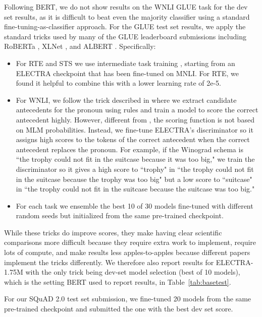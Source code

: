 \documentclass{article}
\begin{document}
Following BERT, we do not show results on the WNLI GLUE task for the dev set results, as it is difficult to beat even the majority classifier using a standard fine-tuning-as-classifier approach.
For the GLUE test set results, we apply the standard tricks used by many of the GLUE leaderboard submissions including RoBERTa \citep{liu2019roberta}, XLNet \citep{yang2019xlnet}, and ALBERT \citep{lan2019albert}. Specifically:
\begin{itemize}
    \item For RTE and STS we use intermediate task training \citep{phang2018sentence}, starting from an ELECTRA checkpoint that has been fine-tuned on MNLI\@. For RTE, we found it helpful to combine this with a lower learning rate of 2e-5. 
    \item For WNLI, we follow the trick described in \citet{liu2019roberta} where we extract candidate antecedents for the pronoun using rules and train a model to score the correct antecedent highly. However, different from \citet{liu2019roberta}, the scoring function is not based on MLM probabilities. Instead, we fine-tune ELECTRA's discriminator so it assigns high scores to the tokens of the correct antecedent when the correct antecedent replaces the pronoun. For example, if the Winograd schema is ``the trophy could not fit in the suitcase because it was too big," we train the discriminator so it gives a high score to ``trophy" in ``the trophy could not fit in the suitcase because the trophy was too big" but a low score to ``suitcase" in ``the trophy could not fit in the suitcase because the suitcase was too big."
    \item For each task we ensemble the best 10 of 30 models fine-tuned with different random seeds but initialized from the same pre-trained checkpoint. 
\end{itemize}
While these tricks do improve scores, they make having clear scientific comparisons more difficult because they require extra work to implement, require lots of compute, and make results less apples-to-apples because different papers implement the tricks differently. We therefore also report results for ELECTRA-1.75M with the only trick being dev-set model selection (best of 10 models), which is the setting BERT used to report results, in Table~\ref{tab:basetest}.

For our SQuAD 2.0 test set submission, we fine-tuned 20 models from the same pre-trained checkpoint and submitted the one with the best dev set score. 
\end{document}
